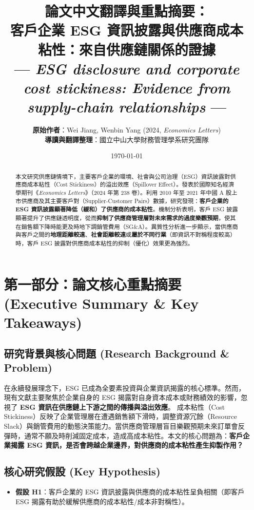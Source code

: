 \documentclass[11pt,a4paper]{article}
\title{\textbf{論文中文翻譯與重點摘要：\\客戶企業 ESG 資訊披露與供應商成本粘性：來自供應鏈關係的證據}\\
\large --- \textit{ESG disclosure and corporate cost stickiness: Evidence from supply-chain relationships} ---}
\author{\textbf{原始作者}：Wei Jiang, Wenbin Yang (2024, \textit{Economics Letters})\\
\textbf{導讀與翻譯整理}：國立中山大學財務管理學系研究團隊}
\date{\today}
\begin{document}
\maketitle

\begin{abstract}
本文研究供應鏈情境下，主要客戶企業的環境、社會與公司治理（ESG）資訊披露對供應商成本粘性（Cost Stickiness）的溢出效應（Spillover Effect）。發表於國際知名經濟學期刊《\textit{Economics Letters}》（2024 年第 238 卷）。利用 2010 年至 2021 年中國 A 股上市供應商及其主要客戶對（Supplier-Customer Pairs）數據，研究發現：\textbf{客戶企業的 ESG 資訊披露顯著降低（緩和）了供應商的成本粘性}。機制分析表明，客戶 ESG 披露顯著提升了供應鏈透明度，從而\textbf{抑制了供應商管理層對未來需求的過度樂觀預期}，使其在銷售額下降時能更及時地下調銷管費用（SG\&A）。異質性分析進一步顯示，當供應商與客戶之間的\textbf{地理距離較遠}、\textbf{社會距離較遠}或\textbf{屬於不同行業}（即資訊不對稱程度較高）時，客戶 ESG 披露對供應商成本粘性的抑制（優化）效果更為強烈。
\end{abstract}

\tableofcontents
\newpage

\section{第一部分：論文核心重點摘要 (Executive Summary \& Key Takeaways)}

\subsection{研究背景與核心問題 (Research Background \& Problem)}
在永續發展理念下，ESG 已成為全要素投資與企業資訊揭露的核心標準。然而，現有文獻主要聚焦於企業自身的 ESG 揭露對自身資本成本或財務績效的影響，忽視了 \textbf{ESG 資訊在供應鏈上下游之間的傳播與溢出效應}。
成本粘性（Cost Stickiness）反映了企業管理層在遭遇銷售額下滑時，調整資源冗餘（Resource Slack）與銷管費用的動態決策能力。當供應商管理層盲目樂觀預期未來訂單會反彈時，通常不願及時削減固定成本，造成高成本粘性。本文的核心問題為：\textbf{客戶企業揭露 ESG 資訊，是否會跨越企業邊界，對供應商的成本粘性產生抑製作用？}

\subsection{核心研究假設 (Key Hypothesis)}
\begin{itemize}[leftmargin=2em]
    \item \textbf{假設 H1}：客戶企業的 ESG 資訊披露與供應商的成本粘性呈負相關（即客戶 ESG 揭露有助於緩解供應商的成本粘性/成本非對稱性）。
\end{itemize}
\end{document}
